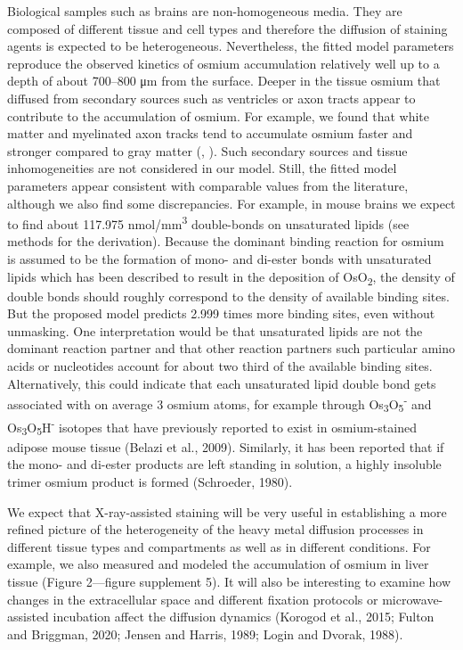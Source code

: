 \documentclass{article}
\begin{document}
Biological samples such as brains are non-homogeneous media. They are composed of different tissue and cell types and therefore the diffusion of staining agents is expected to be heterogeneous. Nevertheless, the fitted model parameters reproduce the observed kinetics of osmium accumulation relatively well up to a depth of about 700–800 μm from the surface. Deeper in the tissue osmium that diffused from secondary sources such as ventricles or axon tracts appear to contribute to the accumulation of osmium. For example, we found that white matter and myelinated axon tracks tend to accumulate osmium faster and stronger compared to gray matter (, ). Such secondary sources and tissue inhomogeneities are not considered in our model. Still, the fitted model parameters appear consistent with comparable values from the literature, although we also find some discrepancies. For example, in mouse brains we expect to find about 117.975 nmol/mm\textsuperscript{3} double-bonds on unsaturated lipids (see methods for the derivation). Because the dominant binding reaction for osmium is assumed to be the formation of mono- and di-ester bonds with unsaturated lipids which has been described to result in the deposition of OsO\textsubscript{2}, the density of double bonds should roughly correspond to the density of available binding sites. But the proposed model predicts 2.999 times more binding sites, even without unmasking. One interpretation would be that unsaturated lipids are not the dominant reaction partner and that other reaction partners such particular amino acids or nucleotides account for about two third of the available binding sites. Alternatively, this could indicate that each unsaturated lipid double bond gets associated with on average 3 osmium atoms, for example through Os\textsubscript{3}O\textsubscript{5}\textsuperscript{-} and Os\textsubscript{3}O\textsubscript{5}H\textsuperscript{-} isotopes that have previously reported to exist in osmium-stained adipose mouse tissue (Belazi et al., 2009). Similarly, it has been reported that if the mono- and di-ester products are left standing in solution, a highly insoluble trimer osmium product is formed (Schroeder, 1980).

We expect that X-ray-assisted staining will be very useful in establishing a more refined picture of the heterogeneity of the heavy metal diffusion processes in different tissue types and compartments as well as in different conditions. For example, we also measured and modeled the accumulation of osmium in liver tissue (Figure 2—figure supplement 5). It will also be interesting to examine how changes in the extracellular space and different fixation protocols or microwave-assisted incubation affect the diffusion dynamics (Korogod et al., 2015; Fulton and Briggman, 2020; Jensen and Harris, 1989; Login and Dvorak, 1988).
\end{document}
